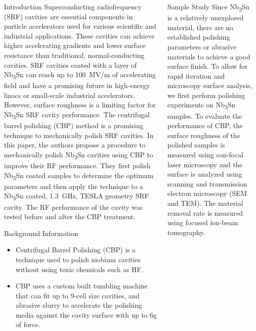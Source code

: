 \documentclass{beamer}
\begin{document}
\begin{frame}{}
        \begin{columns}[t]
            \begin{column}{0.32\linewidth}
                \begin{block}{\label{sec:introduction}Introduction}
                    Superconducting radiofrequency (SRF) cavities are essential components in particle accelerators used for various scientific and industrial applications. These cavities can achieve higher accelerating gradients and lower surface resistance than traditional, normal-conducting cavities. SRF cavities coated with a layer of Nb\textsubscript{3}Sn can reach up to 100~MV/m of accelerating field and have a promising future in high-energy linacs or small-scale industrial accelerators. However, surface roughness is a limiting factor for Nb\textsubscript{3}Sn SRF cavity performance. The centrifugal barrel polishing (CBP) method is a promising technique to mechanically polish SRF cavities. In this paper, the authors propose a procedure to mechanically polish Nb\textsubscript{3}Sn cavities using CBP to improve their RF performance. They first polish Nb\textsubscript{3}Sn coated samples to determine the optimum parameters and then apply the technique to a Nb\textsubscript{3}Sn coated, 1.3~GHz, TESLA geometry SRF cavity. The RF performance of the cavity was tested before and after the CBP treatment.
                \end{block}
                \begin{block}{\label{sec:backgroundinformation}Background Information}
                    \begin{itemize}
                        \item Centrifugal Barrel Polishing (CBP) is a technique used to polish niobium cavities without using toxic chemicals such as HF.
                        \item CBP uses a custom built tumbling machine that can fit up to 9-cell size cavities, and abrasive slurry to accelerate the polishing media against the cavity surface with up to 6g of force.
                    \end{itemize}  
                \end{block}
            \end{column}
            \begin{column}{0.32\linewidth}    
                \begin{block}{\label{sec:samplestudy}Sample Study}
                    Since Nb\textsubscript{3}Sn is a relatively unexplored material, there are no established polishing parameters or abrasive materials to achieve a good surface finish. To allow for rapid iteration and microscopy surface analysis, we first perform polishing experiments on Nb\textsubscript{3}Sn samples. To evaluate the performance of CBP, the surface roughness of the polished samples is measured using con-focal laser microscopy and the surface is analyzed using scanning and transmission electron microscopy (SEM and TEM). The material removal rate is measured using focused ion-beam tomography.

\end{block}
\end{column}
\end{columns}
\end{frame}
\end{document}

